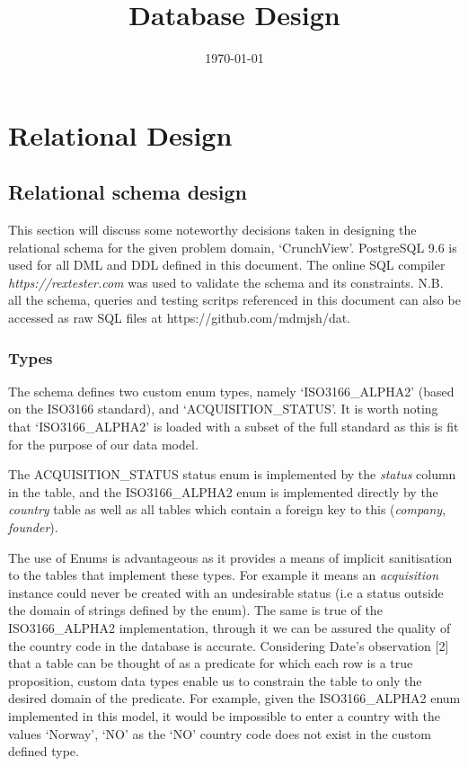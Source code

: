 \documentclass[12pt]{article}
\title{Database Design}
\date{\today}
\begin{document}
\maketitle

\section{Relational Design}

\subsection{Relational schema design}
This section will discuss some noteworthy decisions taken in designing the relational schema for the given problem domain, `CrunchView'. PostgreSQL 9.6 is used for all DML and DDL defined in this document. The online SQL compiler \emph{https://rextester.com} was used to validate the schema and its constraints. N.B. all the schema, queries and testing scritps referenced in this document can also be accessed as raw SQL files at https://github.com/mdmjsh/dat.

\subsubsection{Types}
The schema defines two custom enum types, namely  `ISO3166\_ALPHA2' (based on the ISO3166 standard), and `ACQUISITION\_STATUS'. It is worth noting that `ISO3166\_ALPHA2' is loaded with a subset of the full standard as this is fit for the purpose of our data model.

The ACQUISITION\_STATUS status enum is implemented by the \emph{status} column in the  table, and the ISO3166\_ALPHA2 enum is implemented directly by the \emph{country} table as well as all tables which contain a foreign key to this (\emph{company}, \emph{founder}).

The use of Enums is advantageous as it provides a means of implicit sanitisation to the tables that implement these types. For example it means an \emph{acquisition} instance could never be created with an undesirable status (i.e a status outside the domain of strings defined by the enum). The same is true of the ISO3166\_ALPHA2 implementation, through it we can be assured the quality of the country code in the database is accurate. Considering Date's observation [2] that a table can be thought of as a predicate for which each row is a true proposition, custom data types enable us to constrain the table to only the desired domain of the predicate. For example, given the ISO3166\_ALPHA2 enum implemented in this model, it would be impossible to enter a country with the values `Norway', `NO' as the `NO' country code does not exist in the custom defined type.
\end{document}
